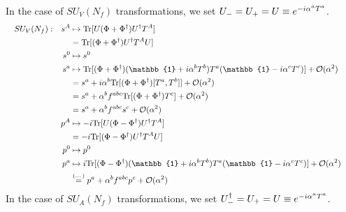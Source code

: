 In the case of $SU_V(N_f)$ transformations, we set ${U_-=U_+=U\equiv e^{-{i}\alpha^aT^a}}$.
\begin{subequations}
    \begin{align}
        &  & SU_V(N_f): &  & s^A& \mapsto \Tr[U(\Phi+\Phi^\dagger)U^\dagger T^A]&&&\\
        &  &&  && = \Tr[(\Phi+\Phi^\dagger)U^\dagger T^AU]&&&\\
        &  &&  &s^0& \mapsto s^0&&&\\
        &  &&  &s^a&\mapsto \Tr[(\Phi+\Phi^\dagger)(\mathbb{1}+\imagu\alpha^bT^b) T^a(\mathbb{1}-\imagu\alpha^cT^c)]+\mathcal{O}(\alpha^2)&&&\\
        &  &&  &&=s^a+\imagu\alpha^b\Tr[(\Phi+\Phi^\dagger)[T^a,T^b]]+\mathcal{O}(\alpha^2)&&&\\
        &  &&  &&=s^a+\alpha^bf^{abc}\Tr[(\Phi+\Phi^\dagger)T^c]+\mathcal{O}(\alpha^2)&&&\\
        &  &&  &&=s^a+\alpha^bf^{abc}s^c+\mathcal{O}(\alpha^2)&&&\\
        &  & &  & p^A& \mapsto -\imagu\Tr[U(\Phi-\Phi^\dagger)U^\dagger T^A]&&&\\
        &  &&  && = -\imagu\Tr[(\Phi-\Phi^\dagger)U^\dagger T^AU]&&&\\
        &  &&  &p^0& \mapsto p^0&&&\\
        &  &&  &p^a&\mapsto \imagu\Tr[(\Phi-\Phi^\dagger)(\mathbb{1}+\imagu\alpha^bT^b) T^a(\mathbb{1}-\imagu\alpha^cT^c)]+\mathcal{O}(\alpha^2)&&&\\
        &  &&  &&\overset{(\dots)}{=}p^a+\alpha^bf^{abc}p^c+\mathcal{O}(\alpha^2)&&&
    \end{align}
\end{subequations}
In the case of $SU_A(N_f)$ transformations, we set ${U_-^\dagger=U_+=U\equiv e^{-{i}\alpha^aT^a}}$.
